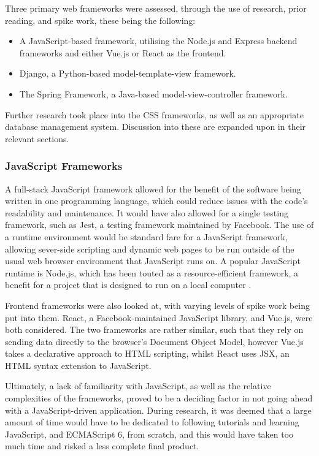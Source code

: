 Three primary web frameworks were assessed, through the use of research, prior reading, and spike work, these being the following:

\begin{itemize}
\item	A JavaScript-based framework, utilising the Node.js and Express backend frameworks and either Vue.js or React as the frontend.
\item	Django, a Python-based model-template-view framework.
\item	The Spring Framework, a Java-based model-view-controller framework.
\end{itemize}

Further research took place into the CSS frameworks, as well as an appropriate database management system. Discussion into these are expanded upon in their relevant sections.

\subsubsection{JavaScript Frameworks}

A full-stack JavaScript framework allowed for the benefit of the software being written in one programming language, which could reduce issues with the code's readability and maintenance. It would have also allowed for a single testing framework, such as Jest, a testing framework maintained by Facebook\cite{Antonio2015}. 
The use of a runtime environment would be standard fare for a JavaScript framework, allowing sever-side scripting and dynamic web pages to be run outside of the usual web browser environment that JavaScript runs on. A popular JavaScript runtime is Node.js, which has been touted as a resource-efficient framework, a benefit for a project that is designed to run on a local computer \cite{ChaniotisIoannis2015INav}.


Frontend frameworks were also looked at, with varying levels of spike work being put into them. React, a Facebook-maintained JavaScript library, and Vue.js, were both considered. The two frameworks are rather similar, such that they rely on sending data directly to the browser's Document Object Model, however Vue.js takes a declarative approach to HTML scripting, whilst React uses JSX, an HTML syntax extension to JavaScript\cite{VueJS}.


Ultimately, a lack of familiarity with JavaScript, as well as the relative complexities of the frameworks, proved to be a deciding factor in not going ahead with a JavaScript-driven application. During research, it was deemed that a large amount of time would have to be dedicated to following tutorials and learning JavaScript, and ECMAScript 6, from scratch, and this would have taken too much time and risked a less complete final product.

